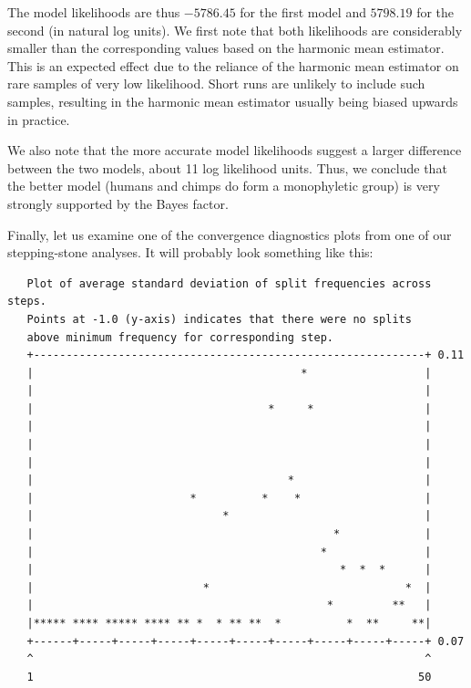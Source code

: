\documentclass[12pt]{book}
\begin{document}
The model likelihoods are thus $-5786.45$ for the first model and $5798.19$ for the second (in
natural log units). We first note that both likelihoods are considerably smaller than the
corresponding values based on the harmonic mean estimator. This is an expected effect due to the
reliance of the harmonic mean estimator on rare samples of very low likelihood. Short runs are
unlikely to include such samples, resulting in the harmonic mean estimator usually being biased
upwards in practice.

We also note that the more accurate model likelihoods suggest a larger difference between the two
models, about 11 log likelihood units. Thus, we conclude that the better model (humans and chimps
do form a monophyletic group) is very strongly supported by the Bayes factor.

Finally, let us examine one of the convergence diagnostics plots from one of our stepping-stone
analyses. It will probably look something like this:

\footnotesize
\begin{singlespacing}
\begin{verbatim}
   Plot of average standard deviation of split frequencies across steps.
   Points at -1.0 (y-axis) indicates that there were no splits
   above minimum frequency for corresponding step.
   +------------------------------------------------------------+ 0.11
   |                                         *                  |
   |                                                            |
   |                                    *     *                 |
   |                                                            |
   |                                                            |
   |                                                            |
   |                                       *                    |
   |                        *          *    *                   |
   |                             *                              |
   |                                              *             |
   |                                            *               |
   |                                               *  *  *      |
   |                          *                              *  |
   |                                             *         **   |
   |***** **** ***** **** ** *  * ** **  *          *  **     **|
   +------+-----+-----+-----+-----+-----+-----+-----+-----+-----+ 0.07
   ^                                                            ^
   1                                                           50
\end{verbatim}
\end{singlespacing}
\normalsize
\end{document}
